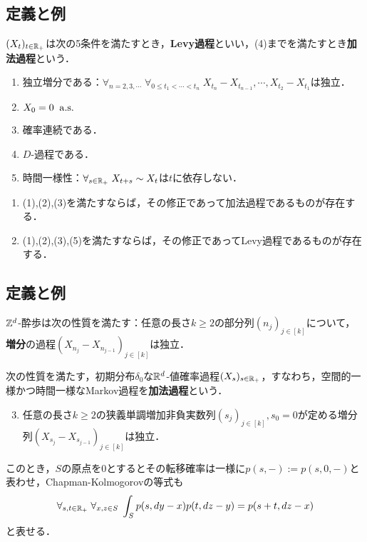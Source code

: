 \documentclass[uplatex,dvipdfmx]{jsreport}
\begin{document}
\subsection{定義と例}

\begin{definition}
    $(X_t)_{t\in\mathbb{R}_+}$は次の5条件を満たすとき，\textbf{Levy過程}といい，(4)までを満たすとき\textbf{加法過程}という．
    \begin{enumerate}
        \item 独立増分である：$\forall_{n=2,3,\cdots}\;\forall_{0\le t_1<\cdots<t_n}\;X_{t_n}-X_{t_{n-1}},\cdots,X_{t_2}-X_{t_1}$は独立．
        \item $X_0=0\;\;\mathrm{a.s.}$
        \item 確率連続である．
        \item $D$-過程である．
        \item 時間一様性：$\forall_{s\in\mathbb{R}_+}\;X_{t+s}\sim X_t$は$t$に依存しない．
    \end{enumerate}
\end{definition}

\begin{theorem}[$D$-変形]\mbox{}
    \begin{enumerate}
        \item (1),(2),(3)を満たすならば，その修正であって加法過程であるものが存在する．
        \item (1),(2),(3),(5)を満たすならば，その修正であってLevy過程であるものが存在する．
    \end{enumerate}
\end{theorem}

\subsection{定義と例}

\begin{example}
    $\mathbb{Z}^d$-酔歩は次の性質を満たす：任意の長さ$k\ge2$の部分列$(n_j)_{j\in[k]}$について，\textbf{増分}の過程$(X_{n_j}-X_{n_{j-1}})_{j\in[k]}$は独立．
\end{example}

\begin{definition}
    次の性質を満たす，初期分布$\delta_0$な$\mathbb{R}^d$-値確率過程$(X_s)_{s\in\mathbb{R}_+}$，すなわち，空間的一様かつ時間一様なMarkov過程を\textbf{加法過程}という．
    \begin{enumerate}\setcounter{enumi}{2}
        \item 任意の長さ$k\ge2$の狭義単調増加非負実数列$(s_j)_{j\in[k]},s_0=0$が定める増分列$(X_{s_j}-X_{s_{j-1}})_{j\in[k]}$は独立．
    \end{enumerate}
    このとき，$S$の原点を$0$とするとその転移確率は一様に$p(s,-):=p(s,0,-)$と表わせ，Chapman-Kolmogorovの等式も
    \[\forall_{s,t\in\mathbb{R}_+}\;\forall_{x,z\in S}\;\int_Sp(s,dy-x)p(t,dz-y)=p(s+t,dz-x)\]
    と表せる．
\end{definition}
\end{document}
